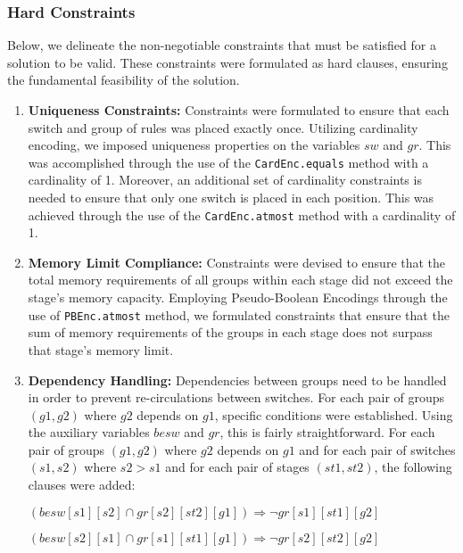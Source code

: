 \subsubsection{Hard Constraints}

Below, we delineate the non-negotiable constraints that must be satisfied for a solution to be valid. These constraints were formulated as hard clauses, ensuring the fundamental feasibility of the solution.

\begin{enumerate}
    \item \textbf{Uniqueness Constraints:} Constraints were formulated to ensure that each switch and group of rules was placed exactly once. Utilizing cardinality encoding, we imposed uniqueness properties on the variables \(sw\) and \(gr\). This was accomplished through the use of the \texttt{CardEnc.equals} method with a cardinality of 1. Moreover, an additional set of cardinality constraints is needed to ensure that only one switch is placed in each position. This was achieved through the use of the \texttt{CardEnc.atmost} method with a cardinality of 1.

    \item \textbf{Memory Limit Compliance:} Constraints were devised to ensure that the total memory requirements of all groups within each stage did not exceed the stage's memory capacity. Employing Pseudo-Boolean Encodings through the use of \texttt{PBEnc.atmost} method, we formulated constraints that ensure that the sum of memory requirements of the groups in each stage does not surpass that stage's memory limit.

    \item \textbf{Dependency Handling:} Dependencies between groups need to be handled in order to prevent re-circulations between switches. For each pair of groups \((g1, g2)\) where \(g2\) depends on \(g1\), specific conditions were established. Using the auxiliary variables \(besw\) and \(gr\), this is fairly straightforward. For each pair of groups \((g1, g2)\) where \(g2\) depends on \(g1\) and for each pair of switches \((s1, s2)\) where \(s2 > s1\) and for each pair of stages \((st1, st2)\), the following clauses were added:
    \begin{center}
        \((besw[s1][s2] \cap gr[s2][st2][g1])\Rightarrow \lnot gr[s1][st1][g2]\)

        \((besw[s2][s1] \cap gr[s1][st1][g1])\Rightarrow \lnot gr[s2][st2][g2]\)
    \end{center}
\end{enumerate}

